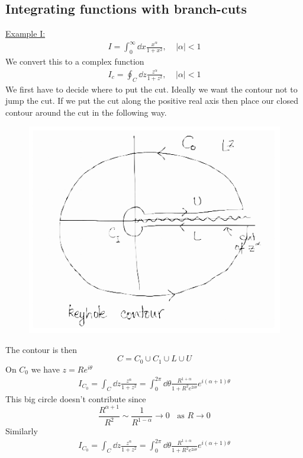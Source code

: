 \documentclass[a4paper,12pt]{article}
\begin{document}
\subsection{Integrating functions with branch-cuts}
\underline{Example I:}
\begin{equation}
\begin{aligned}
I=\int_{0}^{\infty}\dd x \frac{x^\alpha}{1+x^2},~~~~~|\alpha|<1
\end{aligned}
\end{equation}
We convert this to a complex function
\begin{equation}
	\begin{aligned}
		I_c=\oint_{C}\dd z \frac{z^\alpha}{1+z^2},~~~~~|\alpha|<1
	\end{aligned}
\end{equation}
We first have to decide where to put the cut. Ideally we want the contour not to jump the cut. If we put the cut along the positive real axis then place our closed contour around the cut in the following way.
\begin{figure}[H]
	\centering
	\includegraphics[width=0.7\linewidth]{16}
	\caption{}
	\label{fig:4}
\end{figure}
The contour is then
\begin{equation}
C=C_0\cup C_1\cup L\cup U
\end{equation}
On $C_0$ we have $z=Re^{i\theta}$
\begin{equation}
\begin{aligned}
	I_{C_0}=\int_{C}\dd z \frac{z^\alpha}{1+z^2}=\int_{0}^{2\pi}\dd \theta \frac{R^{1+\alpha}}{1+R^2e^{2i\theta}}e^{i(\alpha+1)\theta }
\end{aligned}
\end{equation}
This big circle doesn't contribute since
\begin{equation}
\frac{R^{\alpha+1}}{R^2}\sim \frac{1}{R^{1-\alpha}}\to 0~~~~\text{as }R\to 0 
\end{equation}
Similarly
\begin{equation}
	\begin{aligned}
		I_{C_0}=\int_{C}\dd z \frac{z^\alpha}{1+z^2}=\int_{0}^{2\pi}\dd \theta \frac{R^{1+\alpha}}{1+R^2e^{2i\theta}}e^{i(\alpha+1)\theta }
	\end{aligned}
\end{equation}
\end{document}

